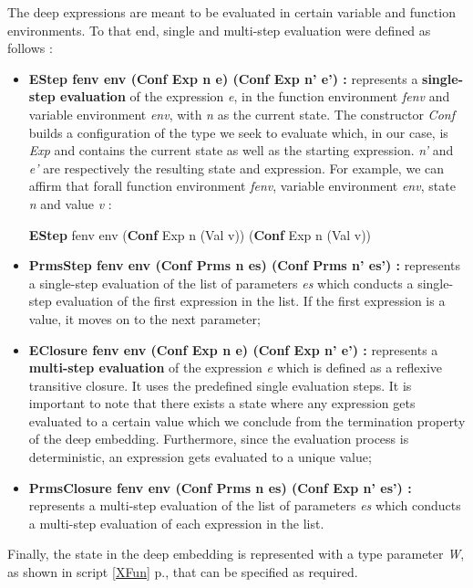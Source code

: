 The deep expressions are meant to be evaluated in certain variable and function environments. To that end, single and multi-step evaluation were defined as follows :
\begin{itemize}
	\item \textbf{EStep fenv env (Conf Exp n e) (Conf Exp n' e') :} represents a \textbf{single-step evaluation} of the expression \textit{e}, in the function environment \textit{fenv} and variable environment \textit{env}, with \textit{n} as the current state. The constructor \textit{Conf} builds a configuration of the type we seek to evaluate which, in our case, is \textit{Exp} and contains the current state as well as the starting expression. \textit{n'} and \textit{e'} are respectively the resulting state and expression. For example, we can affirm that forall function environment \textit{fenv}, variable environment \textit{env}, state \textit{n} and value \textit{v} :
\begin{center}
\textbf{EStep} fenv env (\textbf{Conf} Exp n (Val v)) (\textbf{Conf} Exp n (Val v))
\end{center}

\item \textbf{PrmsStep fenv env (Conf Prms n es) (Conf Prms n' es') :} represents a single-step evaluation of the list of parameters \textit{es} which conducts a single-step evaluation of the first expression in the list. If the first expression is a value, it moves on to the
next parameter;
\item \textbf{EClosure fenv env (Conf Exp n e) (Conf Exp n' e') :} represents a \textbf{multi-step evaluation} of the expression \textit{e} which is defined as a reflexive transitive closure. It uses the predefined single evaluation steps. It is important to note that there exists a state where any expression gets evaluated to a certain value which we conclude from the termination property of the deep embedding. Furthermore, since the evaluation process is deterministic, an expression gets evaluated to a unique value;
\item \textbf{PrmsClosure fenv env (Conf Prms n es) (Conf Exp n' es') :} represents a multi-step evaluation of the list of parameters \textit{es} which conducts a multi-step evaluation of each expression in the list.
\end{itemize}

Finally, the state in the deep embedding is represented with a type parameter \textit{W}, as shown in script \ref{XFun} p.\pageref{XFun}, that can be specified as required. 


